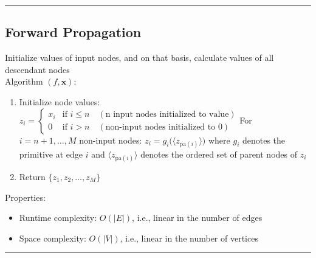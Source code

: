 {\color{black}\hrule height 0.001mm}

\subsection*{Forward Propagation}
Initialize values of input nodes, and on that basis, calculate values of all descendant nodes\\
Algorithm $(f, \boldsymbol{x})$:
\begin{enumerate}
    \item Initialize node values:
    $
    z_i =
    \begin{cases}
    x_i & \textrm{if } i \leq n \quad (\textrm{n input nodes initialized to value}) \\
    0 & \textrm{if } i > n \quad (\textrm{non-input nodes initialized to 0})
    \end{cases}
    $For $i = n+1, \dots, M$ non-input nodes:
    $
    z_i = g_i\big(\langle z_{\textrm{pa}(i)} \rangle\big)
    $
    where $g_i$ denotes the primitive at edge $i$ and $\langle z_{\textrm{pa}(i)} \rangle$ denotes the ordered set of parent nodes of $z_i$
    \item Return $\{z_1, z_2, \dots, z_M\}$
\end{enumerate}
Properties:
\begin{itemize}
    \item Runtime complexity: $O(|E|)$, i.e., linear in the number of edges
    \item Space complexity: $O(|V|)$, i.e., linear in the number of vertices
\end{itemize}

{\color{black}\hrule height 0.001mm}

